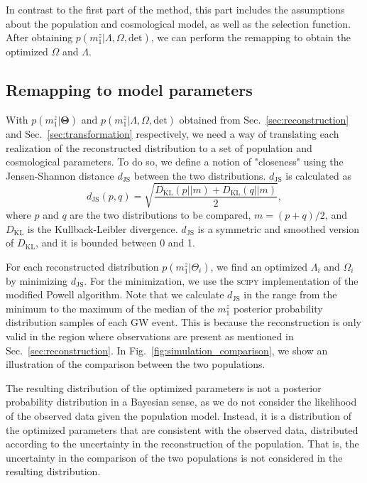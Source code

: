 \documentclass[sn-aps, pdflatex, iicol]{sn-jnl}
\begin{document}
In contrast to the first part of the method, this part includes the assumptions about the population and cosmological model, as well as the selection function.
After obtaining $p(m^z_1|\Lambda, \Omega, \mathrm{det})$, we can perform the remapping to obtain the optimized $\Omega$ and $\Lambda$.

\subsection{Remapping to model parameters}
\label{sec:remapping}

With $p(m^z_1|\mathbf{\Theta})$ and $p(m^z_1|\Lambda, \Omega, \mathrm{det})$ obtained from Sec.~\ref{sec:reconstruction} and Sec.~\ref{sec:transformation} respectively, we need a way of translating each realization of the reconstructed distribution to a set of population and cosmological parameters.
To do so, we define a notion of "closeness" using the Jensen-Shannon distance $d_\mathrm{JS}$ between the two distributions.
$d_\mathrm{JS}$ is calculated as
\begin{equation}
    d_\mathrm{JS}(p, q) = \sqrt{\frac{D_\mathrm{KL}(p||m) + D_\mathrm{KL}(q||m)}{2}},
\end{equation}
where $p$ and $q$ are the two distributions to be compared, $m = (p + q) / 2$, and $D_\mathrm{KL}$ is the Kullback-Leibler divergence.
$d_\mathrm{JS}$ is a symmetric and smoothed version of $D_\mathrm{KL}$, and it is bounded between 0 and 1.

For each reconstructed distribution $p(m^z_1|\Theta_i)$, we find an optimized $\Lambda_i$ and $\Omega_i$ by minimizing $d_\mathrm{JS}$.
For the minimization, we use the \textsc{scipy} \citep{2020SciPy-NMeth} implementation of the modified Powell algorithm.
Note that we calculate $d_\mathrm{JS}$ in the range from the minimum to the maximum of the median of the $m^z_1$ posterior probability distribution samples of each \ac{GW} event.
This is because the reconstruction is only valid in the region where observations are present as mentioned in Sec.~\ref{sec:reconstruction}.
In Fig.~\ref{fig:simulation_comparison}, we show an illustration of the comparison between the two populations.

The resulting distribution of the optimized parameters is not a posterior probability distribution in a Bayesian sense, as we do not consider the likelihood of the observed data given the population model.
Instead, it is a distribution of the optimized parameters that are consistent with the observed data, distributed according to the uncertainty in the reconstruction of the population.
That is, the uncertainty in the comparison of the two populations is not considered in the resulting distribution.
\end{document}
